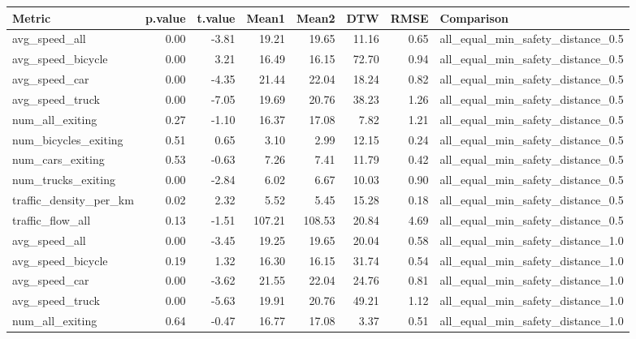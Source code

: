 \begin{table}[ht]
\centering
\begin{tabular}{lrrrrrrl}
  \hline
Metric & p.value & t.value & Mean1 & Mean2 & DTW & RMSE & Comparison \\ 
  \hline
avg\_speed\_all & 0.00 & -3.81 & 19.21 & 19.65 & 11.16 & 0.65 & all\_equal\_min\_safety\_distance\_0.5 \\ 
  avg\_speed\_bicycle & 0.00 & 3.21 & 16.49 & 16.15 & 72.70 & 0.94 & all\_equal\_min\_safety\_distance\_0.5 \\ 
  avg\_speed\_car & 0.00 & -4.35 & 21.44 & 22.04 & 18.24 & 0.82 & all\_equal\_min\_safety\_distance\_0.5 \\ 
  avg\_speed\_truck & 0.00 & -7.05 & 19.69 & 20.76 & 38.23 & 1.26 & all\_equal\_min\_safety\_distance\_0.5 \\ 
  num\_all\_exiting & 0.27 & -1.10 & 16.37 & 17.08 & 7.82 & 1.21 & all\_equal\_min\_safety\_distance\_0.5 \\ 
  num\_bicycles\_exiting & 0.51 & 0.65 & 3.10 & 2.99 & 12.15 & 0.24 & all\_equal\_min\_safety\_distance\_0.5 \\ 
  num\_cars\_exiting & 0.53 & -0.63 & 7.26 & 7.41 & 11.79 & 0.42 & all\_equal\_min\_safety\_distance\_0.5 \\ 
  num\_trucks\_exiting & 0.00 & -2.84 & 6.02 & 6.67 & 10.03 & 0.90 & all\_equal\_min\_safety\_distance\_0.5 \\ 
  traffic\_density\_per\_km & 0.02 & 2.32 & 5.52 & 5.45 & 15.28 & 0.18 & all\_equal\_min\_safety\_distance\_0.5 \\ 
  traffic\_flow\_all & 0.13 & -1.51 & 107.21 & 108.53 & 20.84 & 4.69 & all\_equal\_min\_safety\_distance\_0.5 \\ 
  avg\_speed\_all & 0.00 & -3.45 & 19.25 & 19.65 & 20.04 & 0.58 & all\_equal\_min\_safety\_distance\_1.0 \\ 
  avg\_speed\_bicycle & 0.19 & 1.32 & 16.30 & 16.15 & 31.74 & 0.54 & all\_equal\_min\_safety\_distance\_1.0 \\ 
  avg\_speed\_car & 0.00 & -3.62 & 21.55 & 22.04 & 24.76 & 0.81 & all\_equal\_min\_safety\_distance\_1.0 \\ 
  avg\_speed\_truck & 0.00 & -5.63 & 19.91 & 20.76 & 49.21 & 1.12 & all\_equal\_min\_safety\_distance\_1.0 \\ 
  num\_all\_exiting & 0.64 & -0.47 & 16.77 & 17.08 & 3.37 & 0.51 & all\_equal\_min\_safety\_distance\_1.0 \\ 

\end{tabular}
\end{table}
